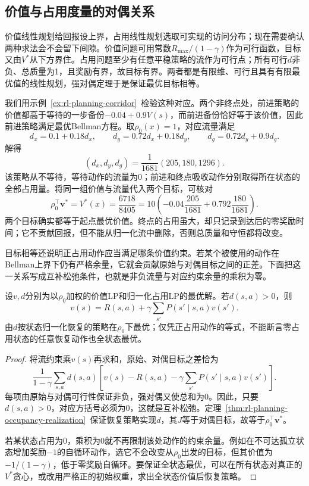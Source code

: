 \subsection{价值与占用度量的对偶关系}
\label{sec:rl-planning-duality}

价值线性规划给回报设上界，占用线性规划选取可实现的访问分布；现在需要确认两种求法会不会留下间隙。价值问题可用常数$R_{\max}/(1-\gamma)$作为可行函数，目标又由$V^*$从下方界住。占用问题至少有任意平稳策略的流作为可行点；所有可行$d$非负、总质量为1，且奖励有界，故目标有界。两者都是有限维、可行且具有有限最优值的线性规划，强对偶定理于是保证最优目标相等。

我们用示例~\ref{ex:rl-planning-corridor}~检验这种对应。两个非终点处，前进策略的价值都高于等待的一步备份$-0.04+0.9V(s)$，而前进备份恰好等于该价值，因此前进策略满足最优Bellman方程。取$\rho_0(x)=1$，对应流量满足
\[
 d_x=0.1+0.18d_x,\qquad
 d_y=0.72d_x+0.18d_y,\qquad
 d_g=0.72d_y+0.9d_g.
\]
解得
\[
 (d_x,d_y,d_g)=\frac{1}{1681}(205,180,1296).
\]
该策略从不等待，等待动作的流量为0；前进和终点吸收动作分别取得所在状态的全部占用量。将同一组价值与流量代入两个目标，可核对
\[
 \rho_0^\top\bm v^*=V^*(x)=\frac{6718}{8405}
 =10\left(-0.04\frac{205}{1681}
           +0.792\frac{180}{1681}\right).
\]
两个目标确实都等于起点最优价值。终点的占用虽大，却只记录到达后的零奖励时间；它不贡献回报，但不能从归一化流中删除，否则总质量和守恒都将改变。

目标相等还说明正占用动作应当满足哪条价值约束。若某个被使用的动作在Bellman上界下仍有严格余量，它就会贡献原始与对偶目标之间的正差。下面把这一关系写成互补松弛条件，也就是非负流量与对应约束余量的乘积为零。

\begin{theorem}[互补松弛与最优动作]
 \label{thm:rl-planning-complementarity}
 设$v,d$分别为以$\rho_0$加权的价值LP和归一化占用LP的最优解。若$d(s,a)>0$，则
 \[
 v(s)=R(s,a)+\gamma\sum_{s'}P(s'\mid s,a)v(s').
 \]
 由$d$按状态归一化恢复的策略在$\rho_0$下最优；仅凭正占用动作的等式，不能断言零占用状态的任意恢复动作也全状态最优。
\end{theorem}
\begin{proof}
 将流约束乘$v(s)$再求和，原始、对偶目标之差恰为
 \[
 \frac{1}{1-\gamma}\sum_{s,a}d(s,a)
 \left[v(s)-R(s,a)-\gamma\sum_{s'}P(s'\mid s,a)v(s')\right].
 \]
 每项由原始与对偶可行性保证非负，强对偶又使总和为0。因此，只要$d(s,a)>0$，对应方括号必须为0，这就是互补松弛。定理~\ref{thm:rl-planning-occupancy-realization}~保证恢复策略实现$d$，其$J$等于对偶目标，故等于$\rho_0^\top\bm v^*$。

 若某状态占用为0，乘积为0就不再限制该处动作的约束余量。例如在不可达孤立状态增加奖励$-1$的自循环动作，选它不会改变从$\rho_0$出发的目标，但其价值为$-1/(1-\gamma)$，低于零奖励自循环。要保证全状态最优，可以在所有状态对真正的$V^*$贪心，或改用严格正的初始权重，求出全状态价值后恢复策略。
\end{proof}

